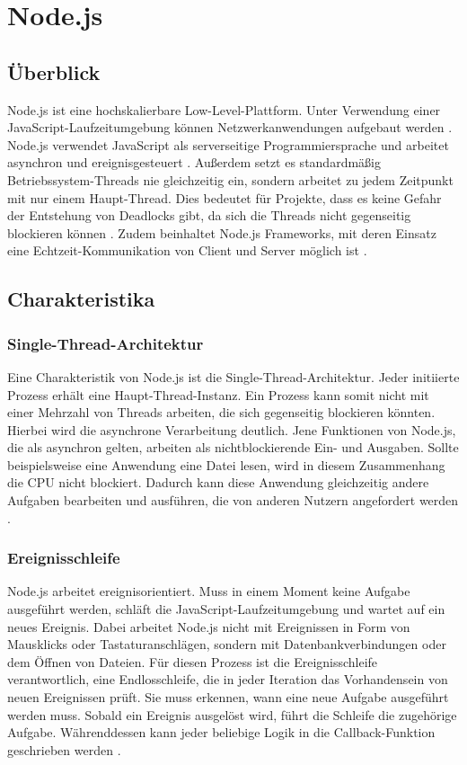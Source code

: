 \chapter{Node.js}\label{node}

\section{Überblick}
Node.js ist eine hochskalierbare Low-Level-Plattform. Unter Verwendung einer JavaScript-Laufzeitumgebung können Netzwerkanwendungen aufgebaut werden \cite[S.1]{neins}. Node.js verwendet JavaScript als serverseitige Programmiersprache \cite[S.3]{neins} und arbeitet asynchron und ereignisgesteuert \cite{nzwei}. 
Außerdem setzt es standardmäßig Betriebssystem-Threads nie gleichzeitig ein, sondern arbeitet zu jedem Zeitpunkt mit nur einem Haupt-Thread. Dies bedeutet für Projekte, dass es keine Gefahr der Entstehung von Deadlocks gibt, da sich die Threads nicht gegenseitig blockieren können \cite{nzwei}. Zudem beinhaltet Node.js Frameworks, mit deren Einsatz eine Echtzeit-Kommunikation von Client und Server möglich ist \cite[S.3]{neins}.

\section{Charakteristika}

\subsection{Single-Thread-Architektur}
Eine Charakteristik von Node.js ist die Single-Thread-Architektur. Jeder initiierte Prozess erhält eine Haupt-Thread-Instanz. Ein Prozess kann somit nicht mit einer Mehrzahl von Threads arbeiten, die sich gegenseitig blockieren könnten. 
Hierbei wird die asynchrone Verarbeitung deutlich. Jene Funktionen von Node.js, die als asynchron gelten, arbeiten als nichtblockierende Ein- und Ausgaben. Sollte beispielsweise eine Anwendung eine Datei lesen, wird in diesem Zusammenhang die CPU nicht blockiert. Dadurch kann diese Anwendung gleichzeitig andere Aufgaben bearbeiten und ausführen, die von anderen Nutzern angefordert werden \cite[S.1]{neins}.

\subsection{Ereignisschleife}

Node.js arbeitet ereignisorientiert. Muss in einem Moment keine Aufgabe ausgeführt werden, schläft die JavaScript-Laufzeitumgebung und wartet auf ein neues Ereignis. Dabei arbeitet Node.js nicht mit Ereignissen in Form von Mausklicks oder Tastaturanschlägen, sondern mit Datenbankverbindungen oder dem Öffnen von Dateien. 
Für diesen Prozess ist die Ereignisschleife verantwortlich, eine Endlosschleife, die in jeder Iteration das Vorhandensein von neuen Ereignissen prüft. Sie muss erkennen, wann eine neue Aufgabe ausgeführt werden muss. Sobald ein Ereignis ausgelöst wird, führt die Schleife die zugehörige Aufgabe. Währenddessen kann jeder beliebige Logik in die Callback-Funktion geschrieben werden \cite[S.3]{neins}.

